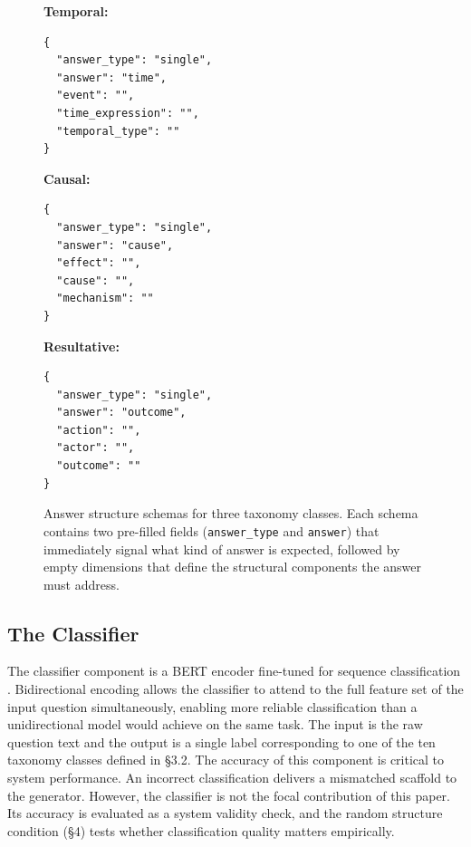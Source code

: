 \documentclass{article}
\begin{document}
\begin{figure}[ht]
\centering
\begin{minipage}[t]{0.30\textwidth}
\textbf{Temporal:}
\begin{verbatim}
{
  "answer_type": "single",
  "answer": "time",
  "event": "",
  "time_expression": "",
  "temporal_type": ""
}
\end{verbatim}
\end{minipage}
\hfill
\begin{minipage}[t]{0.30\textwidth}
\textbf{Causal:}
\begin{verbatim}
{
  "answer_type": "single",
  "answer": "cause",
  "effect": "",
  "cause": "",
  "mechanism": ""
}
\end{verbatim}
\end{minipage}
\hfill
\begin{minipage}[t]{0.30\textwidth}
\textbf{Resultative:}
\begin{verbatim}
{
  "answer_type": "single",
  "answer": "outcome",
  "action": "",
  "actor": "",
  "outcome": ""
}
\end{verbatim}
\end{minipage}
\caption{Answer structure schemas for three taxonomy classes. Each schema contains two pre-filled fields (\texttt{answer\_type} and \texttt{answer}) that immediately signal what kind of answer is expected, followed by empty dimensions that define the structural components the answer must address.}
\label{fig:taxonomy_schemas}
\end{figure}

\subsection{The Classifier}

The classifier component is a BERT encoder fine-tuned for sequence classification \cite{devlin2019bert}. Bidirectional encoding allows the classifier to attend to the full feature set of the input question simultaneously, enabling more reliable classification than a unidirectional model would achieve on the same task. The input is the raw question text and the output is a single label corresponding to one of the ten taxonomy classes defined in \S3.2. The accuracy of this component is critical to system performance. An incorrect classification delivers a mismatched scaffold to the generator. However, the classifier is not the focal contribution of this paper. Its accuracy is evaluated as a system validity check, and the random structure condition (\S4) tests whether classification quality matters empirically.
\end{document}
